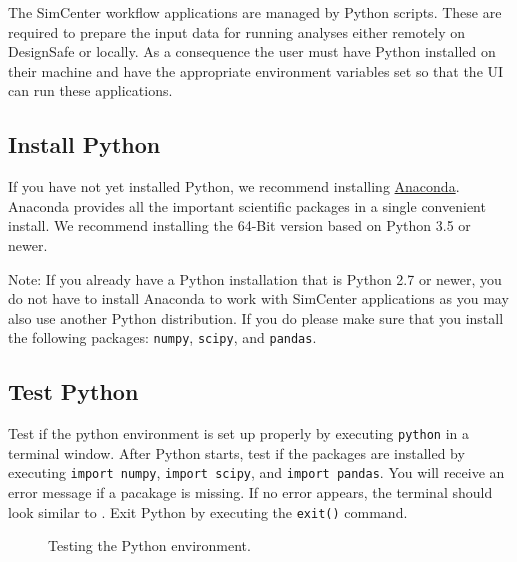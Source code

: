 The SimCenter workflow applications are managed by Python
scripts. These are required to prepare the input data for running
analyses either remotely on DesignSafe or locally. As a consequence the user must have Python
installed on their machine and have the appropriate environment
variables set so that the UI can run these applications.

\subsection{Install Python}

If you have not yet installed Python, we recommend
installing \href{http://www.anaconda.com/distribution/#download-section}{Anaconda}. Anaconda
provides all the important scientific packages in a single convenient
install. We recommend installing the 64-Bit version based on Python
3.5 or newer.

Note: If you already have a Python installation that is Python 2.7 or
newer, you do not have to install Anaconda to work with SimCenter
applications as you may also use another Python distribution.
If you do please make sure that you install the following packages: 
\texttt{numpy}, \texttt{scipy}, and \texttt{pandas}.

\subsection{Test Python}

Test if the python environment is set up properly by
executing \texttt{python} in a terminal window. After Python starts,
test if the packages are installed by executing \texttt{import
numpy}, \texttt{import scipy}, and \texttt{import pandas}. You will
receive an error message if a pacakage is missing. If no error
appears, the terminal should look similar
to . Exit Python by executing
the \texttt{exit()} command.

\begin{figure}[!htbp]
  \caption{Testing the Python environment.}
  \label{fig:python_test}
\end{figure}

